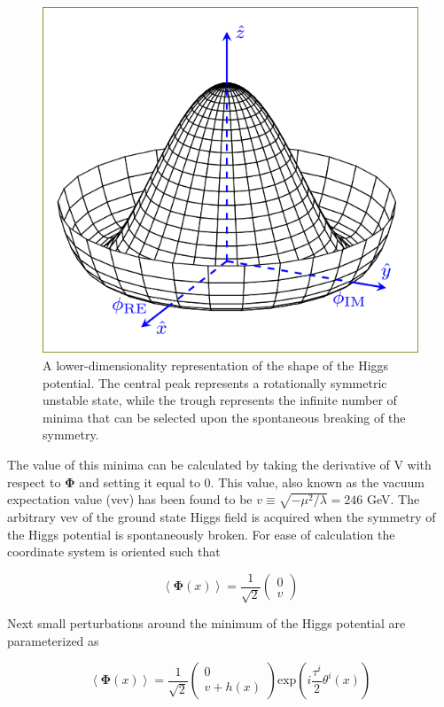 \begin{figure}[!h]
  \begin{center}
    \includegraphics[width=0.4\linewidth]{figures/theory/higgs_potential.png}
    \caption{ A lower-dimensionality representation of the shape of the Higgs
potential.  The central peak represents a rotationally symmetric
unstable state, while the trough represents the infinite number of minima that
can be selected upon the spontaneous breaking of the symmetry.}
    \label{fig:higgs_potential}
  \end{center}
\end{figure}

The value of this minima can be calculated by taking the derivative of V with
respect to $\boldsymbol{\Phi}$ and setting it equal to $0$. This value, also
known as the vacuum expectation value (vev) has been found to be $v \equiv
\sqrt{-\mu^{2}/\lambda} = 246$ GeV. The arbitrary vev of the ground state Higgs
field is acquired when the symmetry of the Higgs potential is spontaneously broken.
For ease of calculation the coordinate system is oriented such that

\begin{equation}
\left\langle \boldsymbol{\Phi}(x) \right\rangle = \frac{1}{\sqrt{2}} \left(
\begin{matrix} 0 \\ v \end{matrix} \right)
\end{equation} 

Next small perturbations around the minimum of the Higgs
potential are parameterized as 

\begin{equation} \label{eq:higgs:broken_higgs}
\left\langle \boldsymbol{\Phi}(x) \right\rangle = \frac{1}{\sqrt{2}} \left(
\begin{matrix} 0 \\ v + h(x) \end{matrix} \right) \text{exp} \left(
i\frac{\tau^{i}}{2}\theta^{i}(x) \right)
\end{equation} 

